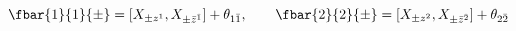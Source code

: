 \begin{equation}
 \fbar{1}{1}{\pm} = [X_{\pm z^1},X_{\pm\bar{z}^{\bar{1}}}]+\theta_{1\bar{1}},
 \qquad
 \fbar{2}{2}{\pm} = [X_{\pm z^2},X_{\pm\bar{z}^{\bar{2}}}]+\theta_{2\bar{2}}
\end{equation}

